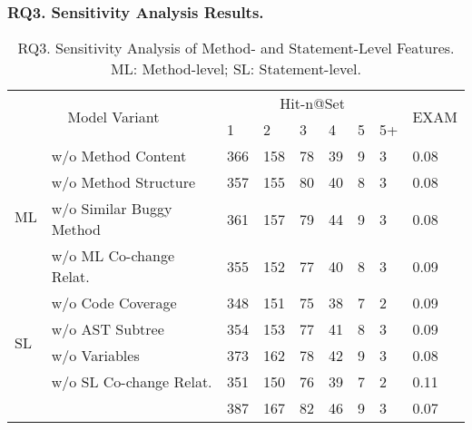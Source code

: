 \subsubsection{\bf RQ3. Sensitivity Analysis Results.}\label{sensi}

\begin{table}[t]
	\caption{RQ3. Sensitivity Analysis of Method- and Statement-Level Features. ML: Method-level; SL: Statement-level.}
        \vspace{-6pt}
	{\footnotesize
		\begin{center}
			\renewcommand{\arraystretch}{1}
			\begin{tabular}{p{0.3cm}<{\centering}|p{3cm}|p{0.3cm}<{\centering}|p{0.3cm}<{\centering}|p{0.2cm}<{\centering}|p{0.2cm}<{\centering}|p{0.15cm}<{\centering}|p{0.15cm}<{\centering}|p{0.5cm}<{\centering}}
				\hline
				\multicolumn{2}{c|}{\multirow{2}{*}{Model Variant}}    & \multicolumn{6}{c|}{Hit-n@Set}& \multirow{2}{*}{EXAM}\\
				\cline{3-8}
				                 \multicolumn{2}{c|}{}   &1&2&3&4&5&5+&\\
				
				\hline 
				\multirow{4}{*}{ML}&w/o Method Content              & 366 & 158 & 78  & 39 & 9 & 3   & 0.08\\\cline{2-9}
				&w/o	Method Structure	                        & 357 & 155 & 80  & 40 & 8 & 3   & 0.08\\ \cline{2-9}
				&w/o Similar Buggy Method    	& 361 & 157 & 79  & 44 & 9 & 3   & 0.08\\ \cline{2-9}
				&w/o ML Co-change Relat.         & 355 & 152 & 77  & 40 & 8 &  3  &0.09 \\ \cline{2-9}
				\hline
				\multirow{4}{*}{SL}&w/o Code Coverage               & 348 & 151 & 75  & 38 & 7 & 2   & 0.09\\\cline{2-9}
				&w/o	AST Subtree	        & 354 & 153 & 77  & 41 & 8 & 3   & 0.09\\ \cline{2-9}
				&w/o Variables               	& 373 & 162 & 78  & 42 & 9 & 3   & 0.08\\ \cline{2-9}
				&w/o SL Co-change Relat.        & 351 & 150 & 76 & 39 & 7 &  2  & 0.11 \\ \cline{2-9}
				\hline
			&	\tool                           & 387 & 167 & 82  & 46 & 9 & 3   & 0.07\\ \cline{2-9}
				\hline
			\end{tabular}
			
			\label{fig:rq3-1}
		\end{center}
	}
\end{table}

